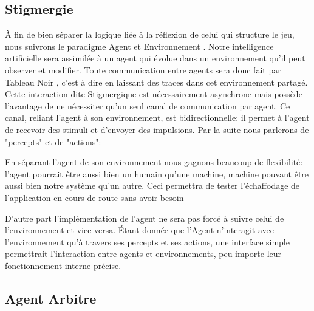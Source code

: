 \subsection{ \og Stigmergie \fg{} }

À fin de bien séparer la logique liée à la réflexion de celui qui structure le jeu, nous suivrons le paradigme \og Agent et Environnement \fg{}. Notre intelligence artificielle sera assimilée à un agent qui évolue dans un environnement qu'il peut observer et modifier. 
Toute communication entre agents sera donc fait par \og Tableau Noir \fg{}, c'est à dire en laissant des traces dans cet environnement partagé. Cette interaction dite \og Stigmergique \fg{} est nécessairement asynchrone mais possède l'avantage de ne nécessiter qu'un seul canal de communication par agent.
Ce canal, reliant l'agent à son environnement, est bidirectionnelle: il permet à l'agent de recevoir des stimuli et d'envoyer des impulsions. Par la suite nous parlerons de "percepts" et de "actions":


En séparant l'agent de son environnement nous gagnons beaucoup de flexibilité: l'agent pourrait être aussi bien un humain qu'une machine, machine pouvant être aussi bien notre système qu'un autre. Ceci permettra de tester l'échaffodage de l'application en cours de route sans avoir besoin 


D'autre part l'implémentation de l'agent ne sera pas forcé à suivre celui de l'environnement et vice-versa. Étant donnée que l'Agent n'interagit avec l'environnement qu'à travers ses percepts et ses actions, une interface simple permettrait l'interaction entre agents et environnements, peu importe leur fonctionnement interne précise.

\subsection{ Agent \og Arbitre \fg{} }

